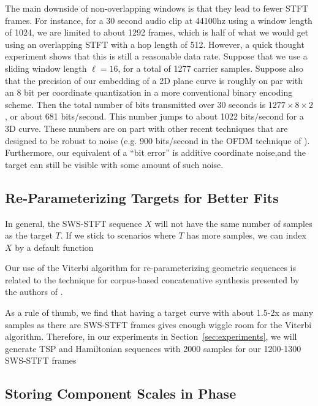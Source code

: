 \documentclass[runningheads]{llncs}
\begin{document}
The main downside of non-overlapping windows is that they lead to fewer STFT frames.  For instance, for a 30 second audio clip at 44100hz using a window length of 1024, we are limited to about 1292 frames, which is half of what we would get using an overlapping STFT with a hop length of 512.  However, a quick thought experiment shows that this is still a reasonable data rate.  Suppose that we use a sliding window length $\ell=16$, for a total of 1277 carrier samples.  Suppose also that the precision of our embedding of a 2D plane curve is roughly on par with an 8 bit per coordinate quantization in a more conventional binary encoding scheme.  Then the total number of bits transmitted over 30 seconds is $1277 \times 8 \times 2$, or about 681 bits/second.  This number jumps to about 1022 bits/second for a 3D curve.  These numbers are on part with other recent techniques that are designed to be robust to noise (e.g. 900 bits/second in the OFDM technique of \cite{eichelberger_receiving_2019}).  Furthermore, our equivalent of a ``bit error'' is additive coordinate noise,and the target can still be visible with some amount of such noise.




\subsection{Re-Parameterizing Targets for Better Fits}
\label{sec:reparam}

In general, the SWS-STFT sequence $X$ will not have the same number of samples as the target $T$.  If we stick to scenarios where $T$ has more samples, we can index $X$ by a default function 



Our use of the Viterbi algorithm for re-parameterizing geometric sequences is related to the technique for corpus-based concatenative synthesis presented by the authors of \cite{schwarz2007corpus}.


As a rule of thumb, we find that having a target curve with about 1.5-2x as many samples as there are SWS-STFT frames gives enough wiggle room for the Viterbi algorithm.  Therefore, in our experiments in Section~\ref{sec:experiments}, we will generate TSP and Hamiltonian sequences with 2000 samples for our 1200-1300 SWS-STFT frames

\subsection{Storing Component Scales in Phase}
\label{sec:componentscales}
\end{document}
